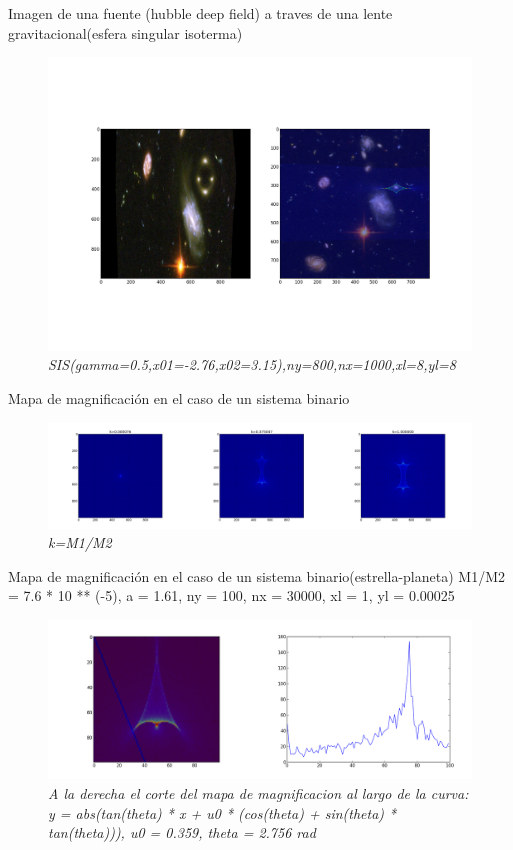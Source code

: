 \documentclass[12pt]{book}
\begin{document}
Imagen de una fuente (hubble deep field) a traves de una lente gravitacional(esfera singular isoterma)
\begin{figure}[!h]
 \centering
 \includegraphics[scale=0.4]{hubble1.png}
 \caption{\emph{SIS(gamma=0.5,x01=-2.76,x02=3.15),ny=800,nx=1000,xl=8,yl=8}}
 \label{Fig: 2}
\end{figure}


Mapa de magnificación en el caso de un sistema binario
\begin{figure}[!h]
 \centering
 \includegraphics[scale=0.2]{mag_bs.png}
 \caption{\emph{k=M1/M2}}
 \label{Fig: 3}
\end{figure}


Mapa de magnificación en el caso de un sistema binario(estrella-planeta)
M1/M2 = 7.6 * 10 ** (-5), a = 1.61, ny = 100, nx = 30000, xl = 1, yl = 0.00025 
\begin{figure}[!h]
 \centering
 \includegraphics[scale=0.3]{bscurve.png}
 \caption{\emph{A la derecha el corte del mapa de magnificacion al largo de la curva:  y =  abs(tan(theta) * x + u0 * (cos(theta) + sin(theta) * tan(theta))), u0 = 0.359, theta = 2.756 rad  }}
 \label{Fig: 4}
\end{figure}
\end{document}
